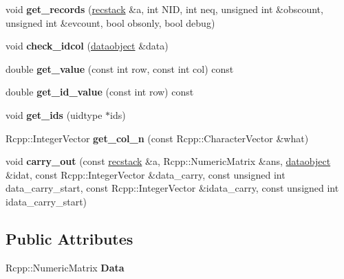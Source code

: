 \begin{DoxyCompactItemize}
void {\bfseries get\+\_\+records} (\hyperlink{odeproblem_8h_a0e40dc57f752f27647c20fc248b86c6f}{recstack} \&a, int N\+ID, int neq, unsigned int \&obscount, unsigned int \&evcount, bool obsonly, bool debug)
\item 
\mbox{\label{classdataobject_a1fde89995a8bbaaf70964bd0dcc90bdd}} 
void {\bfseries check\+\_\+idcol} (\hyperlink{classdataobject}{dataobject} \&data)
\item 
\mbox{\label{classdataobject_a72cc6a0334d9eed18931deb66e283bca}} 
double {\bfseries get\+\_\+value} (const int row, const int col) const
\item 
\mbox{\label{classdataobject_acb2e5de26d52f9518fe6cc040dad21a1}} 
double {\bfseries get\+\_\+id\+\_\+value} (const int row) const
\item 
\mbox{\label{classdataobject_a08757c6b3b80dc258f8271dd5c24b737}} 
void {\bfseries get\+\_\+ids} (uidtype $\ast$ids)
\item 
\mbox{\label{classdataobject_a61b4b28130bb76d1d745e055855c70ea}} 
Rcpp\+::\+Integer\+Vector {\bfseries get\+\_\+col\+\_\+n} (const Rcpp\+::\+Character\+Vector \&what)
\item 
\mbox{\label{classdataobject_a55d175292d064600c8c95550328b3a66}} 
void {\bfseries carry\+\_\+out} (const \hyperlink{odeproblem_8h_a0e40dc57f752f27647c20fc248b86c6f}{recstack} \&a, Rcpp\+::\+Numeric\+Matrix \&ans, \hyperlink{classdataobject}{dataobject} \&idat, const Rcpp\+::\+Integer\+Vector \&data\+\_\+carry, const unsigned int data\+\_\+carry\+\_\+start, const Rcpp\+::\+Integer\+Vector \&idata\+\_\+carry, const unsigned int idata\+\_\+carry\+\_\+start)
\end{DoxyCompactItemize}
\subsection*{Public Attributes}
\begin{DoxyCompactItemize}
\item 
\mbox{\label{classdataobject_ae06ddbecdefdbabd9d91c6904ac7997a}} 
Rcpp\+::\+Numeric\+Matrix {\bfseries Data}
\end{DoxyCompactItemize}
